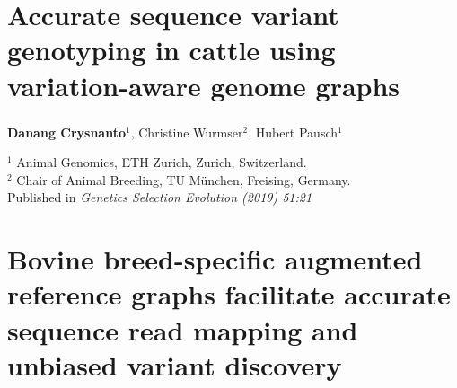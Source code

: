 \documentclass[11 pt, a4paper, notitlepage, twoside]{report}
\begin{document}
\bigskip



\iftwoside
\cleardoublepage
\newpage
\fi


\chapter[Genotyping from variation-aware graphs]{\LARGE{Accurate sequence variant genotyping in cattle using variation-aware genome graphs}}
\label{chap:locgraph}

\subsection*{}
\onehalfspacing
\normalsize

{
\vspace{2em}
\setlength\parindent{0pt}
\large

\textbf{Danang Crysnanto}$^{1}$, Christine Wurmser$^{2}$, Hubert Pausch$^{1}$ \\

\vspace{0.5em}

$^1$ Animal Genomics, ETH Zurich, Zurich, Switzerland. \\
$^2$ Chair of Animal Breeding, TU München, Freising, Germany. \\

\bigskip
Published in \emph{Genetics Selection Evolution (2019) 51:21}

\bigskip

\begin{center}\end{center}

}




\iftwoside
\cleardoublepage
\newpage
\fi



\chapter[Unbiased variant analysis using genome graphs]{\LARGE{Bovine breed-specific augmented reference graphs facilitate accurate sequence read mapping and unbiased variant discovery}}
\label{chap:wholegraph}
\end{document}
